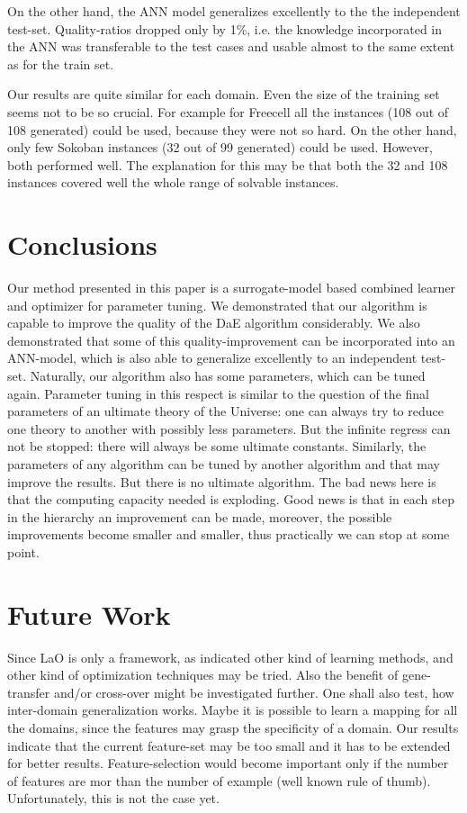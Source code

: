 \documentclass{acm_proc_article-sp}
\begin{document}
On the other hand, the ANN model generalizes excellently to the the independent test-set. Quality-ratios dropped only by 1\%, i.e. the knowledge incorporated in the ANN was transferable to the test cases and usable almost to the same extent as for the train set.

Our results are quite similar for each domain. Even the size of the training set seems not to be so crucial. For example for Freecell all the instances (108 out of 108 generated) could be used, because they were not so hard. On the other hand, only few Sokoban instances (32 out of 99 generated) could be used. However, both performed well. The explanation for this may be that both the 32 and 108 instances covered well the whole range of solvable instances.

\section{Conclusions}
\label{section:conclusions}

Our method presented in this paper is a surrogate-model based combined learner and optimizer for parameter tuning. We demonstrated that our algorithm is capable to improve the quality of the DaE algorithm considerably. We also demonstrated that some of this quality-improvement can be incorporated into an ANN-model, which is also able to generalize excellently to an independent test-set.
Naturally, our algorithm also has some parameters, which can be tuned again. Parameter tuning in this respect is similar to the question of the final parameters of an ultimate theory of the Universe: one can always try to reduce one theory to another with possibly less parameters. But the infinite regress can not be stopped: there will always be some ultimate constants. Similarly, the parameters of any algorithm can be tuned by another algorithm and that may improve the results. But there is no ultimate algorithm. The bad news here is that the computing capacity needed is exploding. Good news is that in each step in the hierarchy an improvement can be made, moreover, the possible improvements become smaller and smaller, thus practically we can stop at some point. 


\section{Future Work}
\label{section:futurework}	

Since LaO is only a framework, as indicated other kind of learning methods, and other kind of optimization techniques may be tried. Also the benefit of gene-transfer and/or cross-over might be investigated further. One shall also test, how inter-domain generalization works. Maybe it is possible to learn a mapping for all the domains, since the features may grasp the specificity of a domain. Our results indicate that the current feature-set may be too small and it has to be extended for better results. Feature-selection would become important only if the number of features are mor than the number of example (well known rule of thumb). Unfortunately, this is not the case yet.
\end{document}
